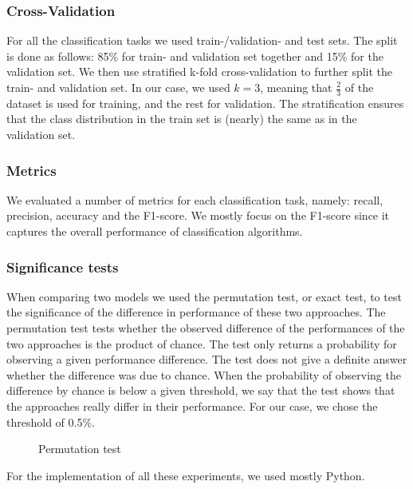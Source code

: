 
\subsubsection{Cross-Validation}
For all the classification tasks we used train-/validation- and test sets.
The split is done as follows: 85\% for train- and validation set together and 15\% for the validation set.
We then use stratified k-fold cross-validation to further split the train- and validation set. In our case, we used $k = 3$, meaning that $\frac{2}{3}$ of the dataset is used for training, and the rest for validation.
The stratification ensures that the class distribution in the train set is (nearly) the same as in the validation set.

\subsubsection{Metrics}
We evaluated a number of metrics for each classification task, namely: 
recall, precision, accuracy and the F1-score. We mostly focus on the F1-score since it captures the overall performance of classification algorithms.

\subsubsection{Significance tests}
When comparing two models we used the permutation test, or exact test, to test the significance of the difference in performance of these two approaches.
The permutation test tests whether the observed difference of the performances of the two approaches is the product of chance.
The test only returns a probability for observing a given performance difference. The test does not give a definite answer whether the difference was due to chance.
When the probability of observing the difference by chance is below a given threshold, we say that the test shows that the approaches really differ in their performance.
For our case, we chose the threshold of 0.5\%.

\begin{figure}[ht]
\centering
\missingfigure[figcolor=white]{}
\caption{Permutation test}
\end{figure}


For the implementation of all these experiments, we used mostly Python.
